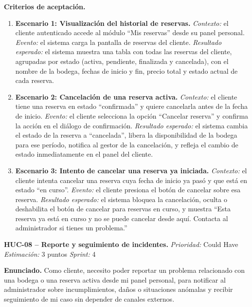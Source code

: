 \textbf{Criterios de aceptación.}
\begin{enumerate}
\item \textbf{Escenario 1: Visualización del historial de reservas.} \textit{Contexto:} el cliente autenticado accede al módulo ``Mis reservas'' desde su panel personal. \textit{Evento:} el sistema carga la pantalla de reservas del cliente. \textit{Resultado esperado:} el sistema muestra una tabla con todas las reservas del cliente, agrupadas por estado (activa, pendiente, finalizada y cancelada), con el nombre de la bodega, fechas de inicio y fin, precio total y estado actual de cada reserva.
\item \textbf{Escenario 2: Cancelación de una reserva activa.} \textit{Contexto:} el cliente tiene una reserva en estado ``confirmada'' y quiere cancelarla antes de la fecha de inicio. \textit{Evento:} el cliente selecciona la opción ``Cancelar reserva'' y confirma la acción en el diálogo de confirmación. \textit{Resultado esperado:} el sistema cambia el estado de la reserva a ``cancelada'', libera la disponibilidad de la bodega para ese período, notifica al gestor de la cancelación, y refleja el cambio de estado inmediatamente en el panel del cliente.
\item \textbf{Escenario 3: Intento de cancelar una reserva ya iniciada.} \textit{Contexto:} el cliente intenta cancelar una reserva cuya fecha de inicio ya pasó y que está en estado ``en curso''. \textit{Evento:} el cliente presiona el botón de cancelar sobre esa reserva. \textit{Resultado esperado:} el sistema bloquea la cancelación, oculta o deshabilita el botón de cancelar para reservas en curso, y muestra ``Esta reserva ya está en curso y no se puede cancelar desde aquí. Contacta al administrador si tienes un problema.''
\end{enumerate}

\textbf{HUC-08 -- Reporte y seguimiento de incidentes.} \label{req:HUC-08}
\textit{Prioridad:} Could Have \quad \textit{Estimación:} 3 puntos \quad \textit{Sprint:} 4

\textbf{Enunciado.} Como cliente, necesito poder reportar un problema relacionado con una bodega o una reserva activa desde mi panel personal, para notificar al administrador sobre incumplimientos, daños o situaciones anómalas y recibir seguimiento de mi caso sin depender de canales externos.

